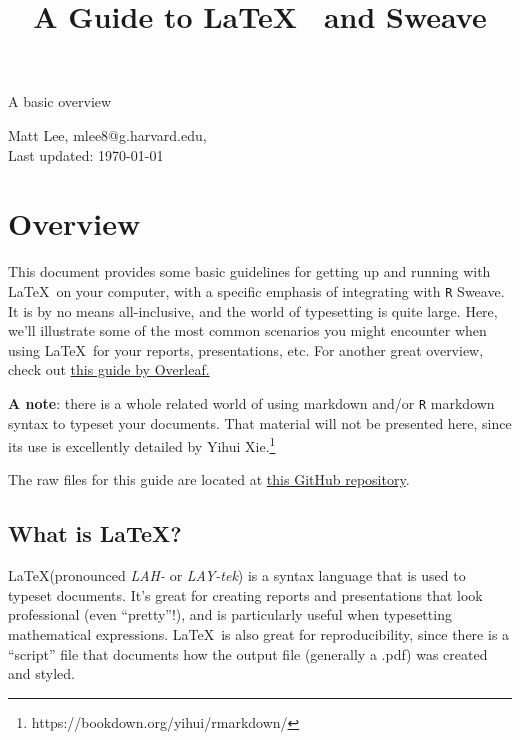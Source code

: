 \documentclass[11pt]{article}\usepackage[]{graphicx}\usepackage[]{color}
\title{\vspace{2cm} \textbf{A Guide to} \LaTeX\ \textbf{ and Sweave}}
\author{}
\date{\vspace{-2cm}}
\begin{document}
\maketitle

\begin{center}
\Large{A basic overview}

\large Matt Lee, mlee8@g.harvard.edu, \\ Last updated: \today
\end{center}

\vspace{6em}





\tableofcontents

\pagebreak


\section{Overview}

This document provides some basic guidelines for getting up and running with \LaTeX\ on your computer, with a specific emphasis of integrating with \texttt{R} Sweave. It is by no means all-inclusive, and the world of typesetting is quite large. Here, we'll illustrate some of the most common scenarios you might encounter when using \LaTeX\ for your reports, presentations, etc. For another great overview, check out \href{https://www.overleaf.com/learn/latex/Learn_LaTeX_in_30_minutes}{this guide by Overleaf.}

\textbf{A note}: there is a whole related world of using markdown and/or \texttt{R} markdown syntax to typeset your documents. That material will not be presented here, since its use is excellently detailed by Yihui Xie.\footnote{https://bookdown.org/yihui/rmarkdown/} 

The raw files for this guide are located at \href{https://github.com/leem26/latex-intro}{this GitHub repository}.

\subsection{What is \LaTeX?}

\LaTeX (pronounced \textit{LAH-} or \textit{LAY-tek}) is a syntax language that is used to typeset documents. It's great for creating reports and presentations that look professional (even ``pretty''!), and is particularly useful when typesetting mathematical expressions. \LaTeX\ is also great for reproducibility, since there is a ``script'' file that documents how the output file (generally a .pdf) was created and styled. 
\end{document}
